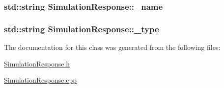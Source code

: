 \subsubsection[{\texorpdfstring{\+\_\+name}{_name}}]{\setlength{\rightskip}{0pt plus 5cm}std\+::string Simulation\+Response\+::\+\_\+name\hspace{0.3cm}{\ttfamily [protected]}}\hypertarget{class_simulation_response_ad68ae541afb9cbf6cce4529eb4fb106f}{}\label{class_simulation_response_ad68ae541afb9cbf6cce4529eb4fb106f}
\subsubsection[{\texorpdfstring{\+\_\+type}{_type}}]{\setlength{\rightskip}{0pt plus 5cm}std\+::string Simulation\+Response\+::\+\_\+type\hspace{0.3cm}{\ttfamily [protected]}}\hypertarget{class_simulation_response_af62ba9398deece20fd91dc29e2a79880}{}\label{class_simulation_response_af62ba9398deece20fd91dc29e2a79880}


The documentation for this class was generated from the following files\+:\begin{DoxyCompactItemize}
\item 
\hyperlink{_simulation_response_8h}{Simulation\+Response.\+h}\item 
\hyperlink{_simulation_response_8cpp}{Simulation\+Response.\+cpp}\end{DoxyCompactItemize}
